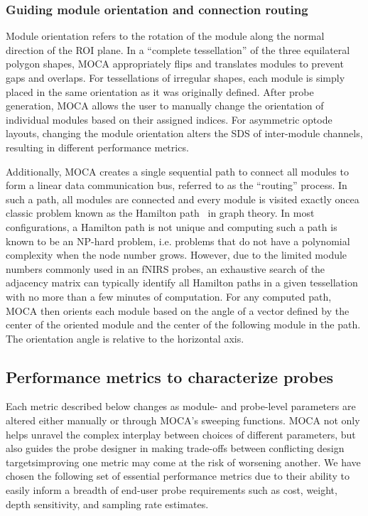 \subsubsection{Guiding module orientation and connection routing}
Module orientation refers to the rotation of the module along the normal direction of the ROI plane. In a ``complete tessellation'' of the three equilateral polygon shapes, MOCA appropriately flips and translates modules to prevent gaps and overlaps. For tessellations of irregular shapes, each module is simply placed in the same orientation as it was originally defined. After probe generation, MOCA allows the user to manually change the orientation of individual modules based on their assigned indices. For asymmetric optode layouts, changing the module orientation alters the SDS of inter-module channels, resulting in different performance metrics.

Additionally, MOCA creates a single sequential path to connect all modules to form a linear data communication bus, referred to as the ``routing'' process. In such a path, all modules are connected and every module is visited exactly once\textemdash a classic problem known as the Hamilton path~\cite{Kamae1967} in graph theory. In most configurations, a Hamilton path is not unique and computing such a path is known to be an NP-hard problem, i.e. problems that do not have a polynomial complexity when the node number grows. However, due to the limited module numbers commonly used in an fNIRS probes, an exhaustive search of the adjacency matrix can typically identify all Hamilton paths in a given tessellation with no more than a few minutes of computation. For any computed path, MOCA then orients each module based on the angle of a vector defined by the center of the oriented module and the center of the following module in the path. The orientation angle is relative to the horizontal axis.

\subsection{Performance metrics to characterize probes}
Each metric described below changes as module- and probe-level parameters are altered either manually or through MOCA's sweeping functions. MOCA not only helps unravel the complex interplay between choices of different parameters, but also guides the probe designer in making trade-offs between conflicting design targets\textemdash improving one metric may come at the risk of worsening another. We have chosen the following set of essential performance metrics due to their ability to easily inform a breadth of end-user probe requirements such as cost, weight, depth sensitivity, and sampling rate estimates.

